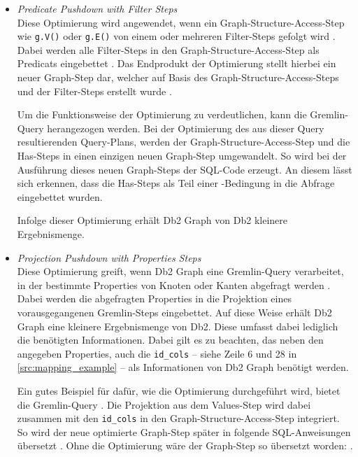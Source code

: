 \begin{itemize}
    \item \textit{Predicate Pushdown with Filter Steps}\\
    Diese Optimierung wird angewendet, wenn ein Graph-Structure-Access-Step wie \texttt{g.V()} oder \texttt{g.E()} von einem oder mehreren Filter-Steps gefolgt wird \cite{sigmod_tian}. Dabei werden alle Filter-Steps in den Graph-Structure-Access-Step als Predicats eingebettet \cite{sigmod_tian}. Das Endprodukt der Optimierung stellt hierbei ein neuer Graph-Step dar, welcher auf Basis des Graph-Structure-Access-Steps und der Filter-Steps erstellt wurde \cite{sigmod_tian}. 
    
    Um die Funktionsweise der Optimierung zu verdeutlichen, kann die Gremlin-Query  herangezogen werden. Bei der Optimierung des aus dieser Query resultierenden Query-Plans, werden der Graph-Structure-Access-Step und die Has-Steps in einen einzigen neuen Graph-Step umgewandelt. So wird bei der Ausführung dieses neuen Graph-Steps der SQL-Code  erzeugt. An diesem lässt sich erkennen, dass die Has-Steps als Teil einer -Bedingung in die Abfrage eingebettet wurden.

    Infolge dieser Optimierung erhält Db2 Graph von Db2  kleinere Ergebnismenge.

    \item \textit{Projection Pushdown with Properties Steps}\\
    Diese Optimierung greift, wenn Db2 Graph eine Gremlin-Query verarbeitet, in der bestimmte Properties von Knoten oder Kanten abgefragt werden \cite{sigmod_tian}. Dabei werden die abgefragten Properties in die Projektion eines vorausgegangenen Gremlin-Steps eingebettet. Auf diese Weise erhält Db2 Graph eine kleinere Ergebnismenge von Db2. Diese umfasst dabei lediglich die benötigten Informationen. Dabei gilt es zu beachten, das neben den angegeben Properties, auch die \texttt{id\_cols} -- siehe Zeile 6 und 28 in \autoref{src:mapping_example} -- als Informationen von Db2 Graph benötigt werden. 

    Ein gutes Beispiel für dafür, wie die Optimierung durchgeführt wird, bietet die Gremlin-Query . Die Projektion aus dem Values-Step wird dabei zusammen mit den \texttt{id\_cols} in den Graph-Structure-Access-Step integriert. So wird der neue optimierte Graph-Step später in folgende SQL-Anweisungen übersetzt . Ohne die Optimierung wäre der Graph-Step so übersetzt worden: .


\end{itemize}
